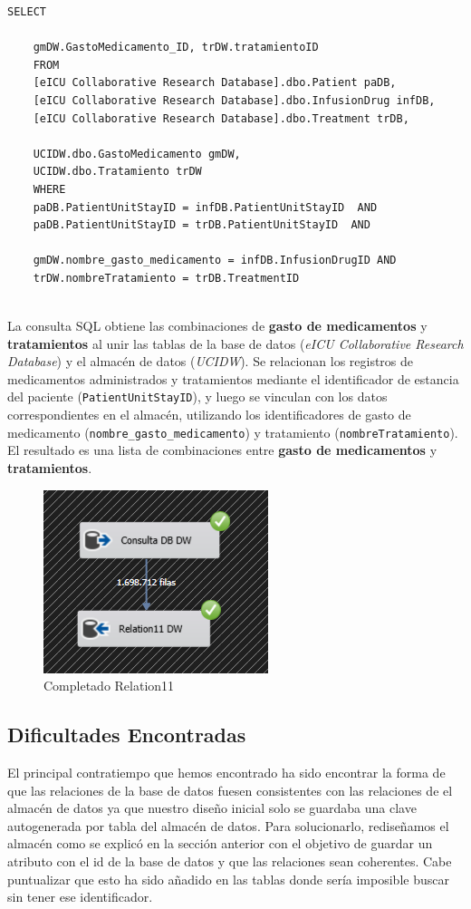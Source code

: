 \documentclass{article}
\begin{document}
	\begin{lstlisting}[style=ddlstyle, label=lst:relation11,caption=Consulta para llenado de relacion 11]
	SELECT 
	
	gmDW.GastoMedicamento_ID, trDW.tratamientoID 
	FROM 
	[eICU Collaborative Research Database].dbo.Patient paDB,
	[eICU Collaborative Research Database].dbo.InfusionDrug infDB,
	[eICU Collaborative Research Database].dbo.Treatment trDB,
	
	UCIDW.dbo.GastoMedicamento gmDW,
	UCIDW.dbo.Tratamiento trDW
	WHERE 
	paDB.PatientUnitStayID = infDB.PatientUnitStayID  AND 
	paDB.PatientUnitStayID = trDB.PatientUnitStayID  AND
	
	gmDW.nombre_gasto_medicamento = infDB.InfusionDrugID AND
	trDW.nombreTratamiento = trDB.TreatmentID 
	
	\end{lstlisting}

	La consulta SQL obtiene las combinaciones de \textbf{gasto de medicamentos} y \textbf{tratamientos} al unir las tablas de la base de datos (\textit{eICU Collaborative Research Database}) y el almacén de datos (\textit{UCIDW}). Se relacionan los registros de medicamentos administrados y tratamientos mediante el identificador de estancia del paciente (\texttt{PatientUnitStayID}), y luego se vinculan con los datos correspondientes en el almacén, utilizando los identificadores de gasto de medicamento (\texttt{nombre\_gasto\_medicamento}) y tratamiento (\texttt{nombreTratamiento}). El resultado es una lista de combinaciones entre \textbf{gasto de medicamentos} y \textbf{tratamientos}.
	
	
	\begin{figure}[H]
		\centering
		\includegraphics[width=.3\linewidth]{./images/completados/relation11.png}
		\caption{Completado Relation11}
	\end{figure}
		

	\subsection{Dificultades Encontradas}
	\label{sec:dificultades_encontradas}
	
	El principal contratiempo que hemos encontrado ha sido encontrar la forma de que las relaciones de la base de datos fuesen consistentes con las relaciones de el almacén de datos ya que nuestro diseño inicial solo se guardaba una clave autogenerada por tabla del almacén de datos. Para solucionarlo, rediseñamos el almacén como se explicó en la sección anterior con el objetivo de guardar un atributo con el id de la base de datos y que las relaciones sean coherentes. Cabe puntualizar que esto ha sido añadido en las tablas donde sería imposible buscar sin tener ese identificador.
	
\end{document}
